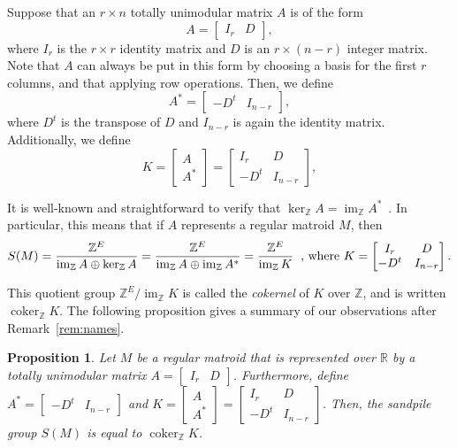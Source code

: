 \documentclass[12p]{amsart}
\numberwithin{equation}{section}
\theoremstyle{plain}
\newtheorem{prop}[thm]{Proposition}
\theoremstyle{definition}
\newcommand{\Z}{\mathbb {Z}}
\DeclareMathOperator{\im}{im}
\DeclareMathOperator{\coker}{coker}
\begin{document}
Suppose that an $r \times n$ totally unimodular matrix $A$ is of the form \begin{equation}\label{eq:stand_form} A = \begin{bmatrix} I_r & D\end{bmatrix},\end{equation}
where $I_r$ is the $r\times r$ identity matrix and $D$ is an $r \times (n-r)$ integer matrix. Note that $A$ can always be put in this form by choosing a basis for the first $r$ columns, and that applying row operations. Then, we define \begin{equation}\label{eq:dual_form}A^* = \begin{bmatrix} -D^t & I_{n-r}\end{bmatrix},\end{equation} where $D^t$ is the transpose of $D$ and $I_{n-r}$ is again the identity matrix. Additionally, we define \begin{equation}\label{eq:combo_form}K = \begin{bmatrix} A \\ A^* \end{bmatrix} = \begin{bmatrix}I_r & D \\-D^t & I_{n-r}\end{bmatrix},\end{equation}

It is well-known and straightforward to verify that $\ker_{\Z}  A = \im_{\Z} A^*$~\cite[Corollary 4.6.6]{MCDthesis}. In particular, this means that if $A$ represents a regular matroid $M$, then 
\begin{equation}\label{eq:sandpile_def}S(M) = \frac{\Z^E}{\im_ {\Z} A\oplus \ker_ {\Z} A} = \frac{\Z^E}{\im_ {\Z} A\oplus \im_ {\Z} A^*} = \frac{\Z^E}{\im_{\Z}K}\hspace{.2 cm}\text{, where } K = \begin{bmatrix} I_r & D \\ -D^t & I_{n-r}\end{bmatrix}.\end{equation}

This quotient group $\Z^E/\im_{\Z}K$ is called the \emph{cokernel} of $K$ over $\mathbb Z$, and is written $\coker_\Z K$. The following proposition gives a summary of our observations after Remark~\ref{rem:names}. 

\begin{prop}
     Let $M$ be a regular matroid that is represented over $\mathbb R$ by a totally unimodular matrix $A = \begin{bmatrix} I_r & D\end{bmatrix}$. Furthermore, define $A^*= \begin{bmatrix} -D^t & I_{n-r}\end{bmatrix}$ and $K = \begin{bmatrix} A \\ A^*\end{bmatrix} = \begin{bmatrix} I_r & D \\ -D^t & I_{n-r}\end{bmatrix}$. Then, the \emph{sandpile group} $S(M)$ is equal to $\coker_{\mathbb Z} K$. 
\end{prop}
\end{document}
